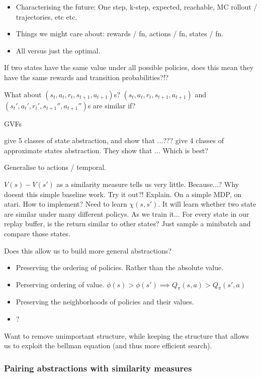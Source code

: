 \begin{itemize}
  \tightlist
  \item Characterising the future: One step, k-step, expected, reachable, MC rollout / trajectories, etc etc.
  \item Things we might care about: rewards / fn, actions / fn, states / fn.
  \item All versus just the optimal.
\end{itemize}

If two states have the same value under all possible policies, does this mean
they have the same rewards and transition probabilities?!?

What about $(s_t, a_t, r_t, s_{t+1}, a_{t+1})$s? $(s_t, a_t, r_t, s_{t+1}, a_{t+1})$ and $(s_t', a_t', r_t', s_{t+1}'', a_{t+1}'')$s are similar if?

GVFs

\cite{Littman2006} give 5 classes of state abstraction, and show that ...???
\cite{Abel2017} give 4 classes of approximate states abstraction. They show that ...
Which is best?

Generalise to actions / temporal.

$V(s) - V(s')$ as a similarity measure tells us very little. Because...?
Why doesnt this simple baseline work. Try it out?! Explain.
On a simple MDP, on atari. How to implement? Need to learn $\chi(s, s')$.
It will learn whether two state are similar under many different policys. As we train it...
For every state in our replay buffer, is the return similar to other states?
Just sample a minibatch and compare those states.

Does this allow us to build more general abstractions?

\begin{itemize}
\tightlist
  \item Preserving the ordering of policies. Rather than the absolute value.
  \item Perserving ordering of value. $\phi(s) > \phi(s') \implies Q_{\pi}(s, a) > Q_{\pi}(s', a)$
  \item Preserving the neighborhoods of policies and their values.
  \item ?
\end{itemize}

Want to remove unimportant structure, while keeping the structure that allows us
to exploit the bellman equation (and thus more efficient search).

\subsubsection{Pairing abstractions with similarity measures}


